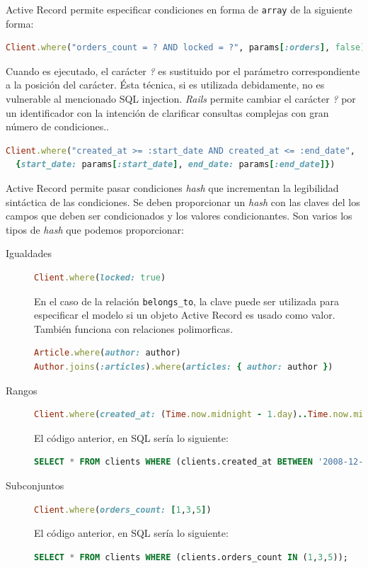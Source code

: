 Active Record permite especificar condiciones en forma de \texttt{array} de la siguiente forma:

\begin{lstlisting}[language=Ruby]
Client.where("orders_count = ? AND locked = ?", params[:orders], false)
\end{lstlisting}

Cuando es ejecutado, el carácter \textit{?} es sustituido por el parámetro correspondiente a la posición del carácter.
Ésta técnica, si es utilizada debidamente, no es vulnerable al mencionado SQL injection.
\textit{Rails} permite cambiar el carácter \textit{?} por un identificador con la intención de clarificar consultas complejas con gran número de condiciones..

\begin{lstlisting}[language=Ruby]
Client.where("created_at >= :start_date AND created_at <= :end_date",
  {start_date: params[:start_date], end_date: params[:end_date]})
\end{lstlisting}

Active Record permite pasar condiciones \textit{hash} que incrementan la legibilidad sintáctica de las condiciones. Se deben proporcionar un \textit{hash} con las claves del los campos que deben ser condicionados y los valores condicionantes.
Son varios los tipos de \textit{hash} que podemos proporcionar:

\begin{description}
\item[Igualdades]
\begin{lstlisting}[language=Ruby]
Client.where(locked: true)
\end{lstlisting}
En el caso de la relación \texttt{belongs\_to}, la clave puede ser utilizada para especificar el modelo si un objeto Active Record es usado como valor. También funciona con relaciones polimorficas.
\begin{lstlisting}[language=Ruby]
Article.where(author: author)
Author.joins(:articles).where(articles: { author: author })
\end{lstlisting}

\item[Rangos]
\begin{lstlisting}[language=Ruby]
Client.where(created_at: (Time.now.midnight - 1.day)..Time.now.midnight)
\end{lstlisting}
El código anterior, en SQL sería lo siguiente:
\begin{lstlisting}[language=SQL]
SELECT * FROM clients WHERE (clients.created_at BETWEEN '2008-12-21 00:00:00' AND '2008-12-22 00:00:00');
\end{lstlisting}

\item[Subconjuntos]
\begin{lstlisting}[language=Ruby]
Client.where(orders_count: [1,3,5])
\end{lstlisting}
El código anterior, en SQL sería lo siguiente:
\begin{lstlisting}[language=SQL]
SELECT * FROM clients WHERE (clients.orders_count IN (1,3,5));
\end{lstlisting}
\end{description}

